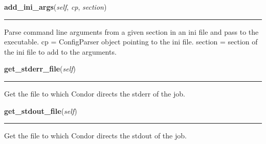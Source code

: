     \label{pipeline:CondorJob:add_ini_args}
    \vspace{0.5ex}

    \noindent\begin{boxedminipage}{\textwidth}

    \raggedright \textbf{add\_ini\_args}(\textit{self}, \textit{cp}, \textit{section})

    \vspace{-1.5ex}

    \rule{\textwidth}{0.5\fboxrule}
    Parse command line arguments from a given section in an ini file and 
    pass to the executable. cp = ConfigParser object pointing to the ini 
    file. section = section of the ini file to add to the arguments.

    \vspace{1ex}

    \end{boxedminipage}

    \label{pipeline:CondorJob:get_stderr_file}
    \vspace{0.5ex}

    \noindent\begin{boxedminipage}{\textwidth}

    \raggedright \textbf{get\_stderr\_file}(\textit{self})

    \vspace{-1.5ex}

    \rule{\textwidth}{0.5\fboxrule}
    Get the file to which Condor directs the stderr of the job.

    \vspace{1ex}

    \end{boxedminipage}

    \label{pipeline:CondorJob:get_stdout_file}
    \vspace{0.5ex}

    \noindent\begin{boxedminipage}{\textwidth}

    \raggedright \textbf{get\_stdout\_file}(\textit{self})

    \vspace{-1.5ex}

    \rule{\textwidth}{0.5\fboxrule}
    Get the file to which Condor directs the stdout of the job.

    \vspace{1ex}

    \end{boxedminipage}

